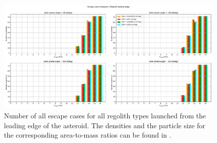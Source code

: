 \begin{figure}[htb]
\centering
\captionsetup{justification=centering}
\includegraphics[angle=90, width=\textwidth, height=\textheight, keepaspectratio=true]{leading_edge_perturbations/allEscapeCases.pdf}
\caption{Number of all escape cases for all regolith types launched from the leading edge of the asteroid. The densities and the particle size for the corresponding area-to-mass ratios can be found in .}
\label{fig:leadingEdge_allParticles_escape_hist}
\end{figure}
\FloatBarrier
